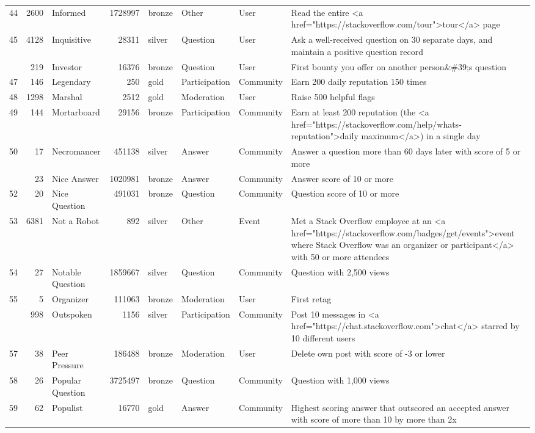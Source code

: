 \documentclass[]{book}
\theoremstyle{definition}
\theoremstyle{definition}
\theoremstyle{definition}
\theoremstyle{remark}
\begin{document}
\begin{landscape}
\begin{longtable}[t]{lr>{\raggedright\arraybackslash}p{2cm}rlll>{\raggedright\arraybackslash}p{10cm}}
44 & 2600 & Informed & 1728997 & bronze & Other & User & Read the entire <a href="https://stackoverflow.com/tour">tour</a> page\\
45 & 4128 & Inquisitive & 28311 & silver & Question & User & Ask a well-received question on 30 separate days, and maintain a positive question record\\
\addlinespace
46 & 219 & Investor & 16376 & bronze & Question & User & First bounty you offer on another person\&\#39;s question\\
47 & 146 & Legendary & 250 & gold & Participation & Community & Earn 200 daily reputation 150 times\\
48 & 1298 & Marshal & 2512 & gold & Moderation & User & Raise 500 helpful flags\\
49 & 144 & Mortarboard & 29156 & bronze & Participation & Community & Earn at least 200 reputation (the <a href="https://stackoverflow.com/help/whats-reputation">daily maximum</a>) in a single day\\
50 & 17 & Necromancer & 451138 & silver & Answer & Community & Answer a question more than 60 days later with score of 5 or more\\
\addlinespace
51 & 23 & Nice Answer & 1020981 & bronze & Answer & Community & Answer score of 10 or more\\
52 & 20 & Nice Question & 491031 & bronze & Question & Community & Question score of 10 or more\\
53 & 6381 & Not a Robot & 892 & silver & Other & Event & Met a Stack Overflow employee at an <a href="https://stackoverflow.com/badges/get/events">event where Stack Overflow was an organizer or participant</a> with 50 or more attendees\\
54 & 27 & Notable Question & 1859667 & silver & Question & Community & Question with 2,500 views\\
55 & 5 & Organizer & 111063 & bronze & Moderation & User & First retag\\
\addlinespace
56 & 998 & Outspoken & 1156 & silver & Participation & Community & Post 10 messages in <a href="https://chat.stackoverflow.com">chat</a> starred by 10 different users\\
57 & 38 & Peer Pressure & 186488 & bronze & Moderation & User & Delete own post with score of -3 or lower\\
58 & 26 & Popular Question & 3725497 & bronze & Question & Community & Question with 1,000 views\\
59 & 62 & Populist & 16770 & gold & Answer & Community & Highest scoring answer that outscored an accepted answer with score of more than 10 by more than 2x\\

\end{longtable}
\end{landscape}
\end{document}

